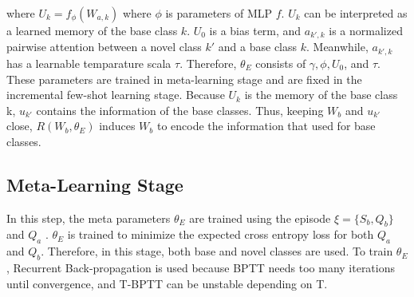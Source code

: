 \documentclass[10pt,twocolumn,letterpaper]{article}
\newcommand{\Qa}{Q_a}
\newcommand{\Qb}{Q_b}
\newcommand{\Sb}{S_b}
\newcommand{\Wb}{W_b}
\begin{document}
where $U_k = f_\phi (W_{a, k})$ where $\phi$ is parameters of MLP  $f$. $U_k$ can be interpreted as a learned memory of the base class $k$. $U_0$ is a bias term, and $a_{k', k}$ is a normalized pairwise attention between a novel class $k'$ and a base class $k$. Meanwhile, $a_{k', k}$ has a learnable temparature scala $\tau$. Therefore, $ \theta_E $ consists of $\gamma, \phi, U_0$, and $ \tau$. These parameters are trained in meta-learning stage and are fixed in the incremental few-shot learning stage. Because $U_k$ is the memory of the base class k, $u_{k'}$ contains the information of the base classes. Thus, keeping $\Wb$ and $u_{k'}$ close, $R(W_b,\theta_E)$ induces $\Wb$ to encode the information that used for base classes.

\subsection{Meta-Learning Stage}\label{meta}
In this step, the meta parameters $ \theta_E $ are trained using the episode $\xi = \{\Sb, \Qb\}$ and $\Qa$ . $ \theta_E $ is trained to minimize the expected cross entropy loss for both $\Qa$ and $\Qb$. Therefore, in this stage, both base and novel classes are used. To train $\theta_{E}$, Recurrent Back-propagation is used because BPTT needs too many iterations until convergence, and T-BPTT can be unstable depending on T.



{\small

}
\end{document}
